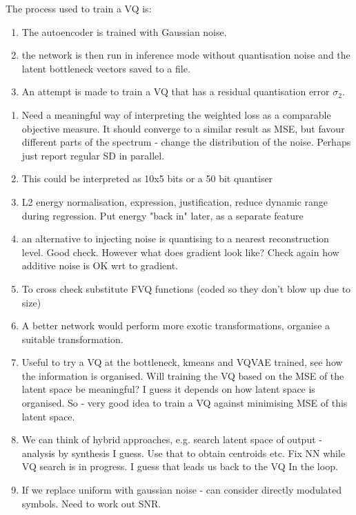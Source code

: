 \documentclass{article}
\begin{document}
The process used to train a VQ is:
\begin{enumerate}
\item The autoencoder is trained with Gaussian noise.
\item the network is then run in inference mode without quantisation noise and the latent bottleneck vectors saved to a file.
\item An attempt is made to train a VQ that has a residual quantisation error $\sigma_2$.
\end{enumerate}

\begin{enumerate}
\item Need a meaningful way of interpreting the weighted loss as a comparable objective measure.  It should converge to a similar result as MSE, but favour different parts of the spectrum - change the distribution of the noise. Perhaps just report regular SD in parallel.
\item This could be interpreted as 10x5 bits or a 50 bit quantiser
\item L2 energy normalisation, expression, justification, reduce dynamic range during regression. Put energy "back in" later, as a separate feature
\item an alternative to injecting noise is quantising to a nearest reconstruction level.  Good check.  However what does gradient look like?  Check again how additive noise is OK wrt to gradient. 
\item To cross check substitute FVQ functions (coded so they don't blow up due to size)
\item A better network would perform more exotic transformations, organise a suitable transformation.
\item Useful to try a VQ at the bottleneck, kmeans and VQVAE trained, see how the information is organised.  Will training the VQ based on the MSE of the latent space be meaningful?  I guess it depends on how latent space is organised.  So - very good idea to train a VQ against minimising MSE of this latent space.
\item We can think of hybrid approaches, e.g. search latent space of output - analysis by synthesis I guess.  Use that to obtain centroids etc.  Fix NN while VQ search is in progress.  I guess that leads us back to the VQ In the loop.
\item If we replace uniform with gaussian noise - can consider directly modulated symbols.  Need to work out SNR.
\end{enumerate}
\end{document}
